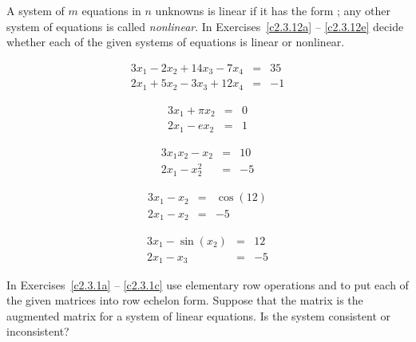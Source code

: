 \noindent A system of $m$ equations in $n$ unknowns is linear if it has
the form ; any other system of equations is called 
{\em nonlinear\/}.   In Exercises~\ref{c2.3.12a} -- 
\ref{c2.3.12e} decide whether each of the given systems of equations 
is linear or nonlinear.
\begin{exercise} \label{c2.3.12a}
\[
\begin{array}{rcl}
3x_1 - 2x_2 +14x_3-7x_4 & = & 35\\
2x_1 + 5x_2 - 3x_3 + 12x_4 & = & -1
\end{array}
\]
\end{exercise}
\begin{exercise} \label{c2.3.12b}
\[
\begin{array}{rcl}
3x_1 + \pi x_2  & = & 0\\
2x_1 - e x_2    & = & 1
\end{array}
\]
\end{exercise}
\begin{exercise} \label{c2.3.12c}
\[
\begin{array}{rcl}
3x_1x_2 -x_2  & = & 10\\
2x_1 -   x_2^2    & = & -5
\end{array}
\]
\end{exercise}
\begin{exercise} \label{c2.3.12d}
\[
\begin{array}{rcl}
3x_1  -x_2  & = & \cos(12)\\
2x_1 -   x_2    & = & -5
\end{array}
\]
\end{exercise}
\begin{exercise} \label{c2.3.12e}
\[
\begin{array}{rcl}
3x_1  - \sin(x_2)  & = & 12\\
2x_1 -   x_3    & = & -5
\end{array}
\]
\end{exercise}

\CEXER



\noindent In Exercises~\ref{c2.3.1a} -- \ref{c2.3.1c} use elementary row
operations and \Matlab to put each of the given matrices into row echelon
form.  Suppose that the matrix is the augmented matrix for a system of
linear equations.  Is the system consistent or inconsistent?

